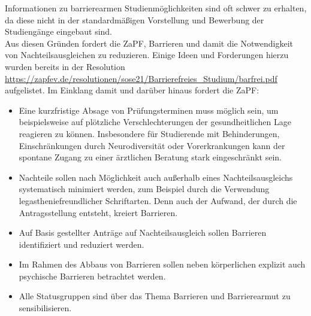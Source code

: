 \documentclass[DIV=calc]{scrartcl}
\begin{document}
Informationen zu barrierearmen Studienmöglichkeiten sind oft schwer zu erhalten, da diese nicht in der standardmäßigen Vorstellung und Bewerbung der Studiengänge eingebaut sind.\\ \newline
Aus diesen Gründen fordert die ZaPF, Barrieren und damit die Notwendigkeit von Nachteilsausgleichen zu reduzieren. Einige Ideen und Forderungen hierzu wurden bereits in der Resolution \url{https://zapfev.de/resolutionen/sose21/Barrierefreies_Studium/barfrei.pdf} aufgelistet. Im Einklang damit und darüber hinaus fordert die ZaPF:
\begin{itemize}
    \item Eine kurzfristige Absage von Prüfungsterminen muss möglich sein, um beispielsweise auf plötzliche Verschlechterungen der gesundheitlichen Lage reagieren zu können. Insbesondere für Studierende mit Behinderungen, Einschränkungen durch Neurodiversität oder Vorerkrankungen kann der spontane Zugang zu einer ärztlichen Beratung stark eingeschränkt sein.
    \item Nachteile sollen nach Möglichkeit auch außerhalb eines Nachteilsausgleichs systematisch minimiert werden, zum Beispiel durch die Verwendung legastheniefreundlicher Schriftarten. Denn auch der Aufwand, der durch die Antragsstellung entsteht, kreiert Barrieren.
    \item Auf Basis gestellter Anträge auf Nachteilsausgleich sollen Barrieren identifiziert und reduziert werden.
    \item Im Rahmen des Abbaus von Barrieren sollen neben körperlichen explizit auch psychische Barrieren betrachtet werden.
    \item Alle Statusgruppen sind über das Thema Barrieren und Barrierearmut zu sensibilisieren.
\end{itemize}
\end{document}
